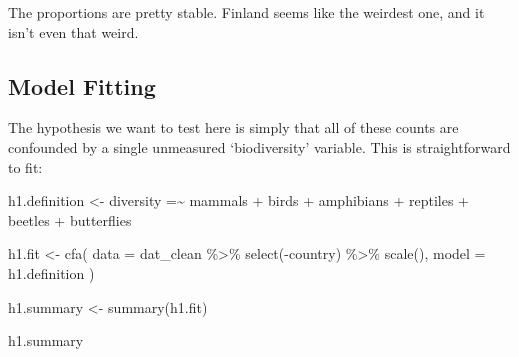\documentclass[
  letterpaper,
  DIV=11,
  numbers=noendperiod]{scrreprt}
\newenvironment{Shaded}{\begin{snugshade}}{\end{snugshade}}
\newcommand{\AttributeTok}[1]{\textcolor[rgb]{0.40,0.45,0.13}{#1}}
\newcommand{\FunctionTok}[1]{\textcolor[rgb]{0.28,0.35,0.67}{#1}}
\newcommand{\NormalTok}[1]{\textcolor[rgb]{0.00,0.23,0.31}{#1}}
\newcommand{\OtherTok}[1]{\textcolor[rgb]{0.00,0.23,0.31}{#1}}
\newcommand{\SpecialCharTok}[1]{\textcolor[rgb]{0.37,0.37,0.37}{#1}}
\newcommand{\StringTok}[1]{\textcolor[rgb]{0.13,0.47,0.30}{#1}}
\begin{document}
The proportions are pretty stable. Finland seems like the weirdest one,
and it isn't even that weird.

\hypertarget{model-fitting-1}{%
\subsection{Model Fitting}\label{model-fitting-1}}

The hypothesis we want to test here is simply that all of these counts
are confounded by a single unmeasured `biodiversity' variable. This is
straightforward to fit:

\begin{Shaded}
\begin{Highlighting}[]
\NormalTok{h1.definition }\OtherTok{\textless{}{-}} 
\StringTok{\textquotesingle{}diversity =\textasciitilde{} mammals + birds + amphibians + reptiles + beetles + butterflies\textquotesingle{}}

\NormalTok{h1.fit }\OtherTok{\textless{}{-}} \FunctionTok{cfa}\NormalTok{(}
  \AttributeTok{data  =}\NormalTok{ dat\_clean }\SpecialCharTok{\%\textgreater{}\%} \FunctionTok{select}\NormalTok{(}\SpecialCharTok{{-}}\NormalTok{country) }\SpecialCharTok{\%\textgreater{}\%} \FunctionTok{scale}\NormalTok{(),}
  \AttributeTok{model =}\NormalTok{ h1.definition}
\NormalTok{)}

\NormalTok{h1.summary }\OtherTok{\textless{}{-}} \FunctionTok{summary}\NormalTok{(h1.fit)}

\NormalTok{h1.summary}
\end{Highlighting}
\end{Shaded}
\end{document}
